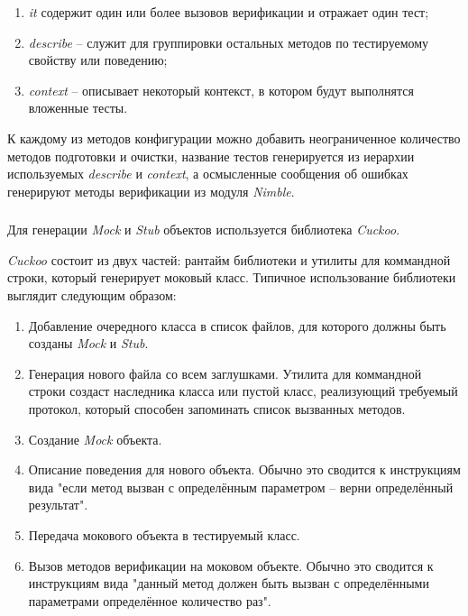 \begin{enumerate}
	\item \textit{it} содержит один или более вызовов верификации и отражает один тест;
	\item \textit{describe} -- служит для группировки остальных методов по тестируемому свойству или поведению;
	\item \textit{context} -- описывает некоторый контекст, в котором будут выполнятся вложенные тесты.
\end{enumerate}

К каждому из методов конфигурации можно добавить неограниченное количество методов подготовки и очистки, название тестов генерируется из иерархии используемых \textit{describe} и \textit{context}, а осмысленные сообщения об ошибках генерируют методы верификации из модуля \textit{Nimble}.

\subsubsection{}
\label{sec:testing:tech:cuckoo}
Для генерации \textit{Mock} и \textit{Stub} объектов используется библиотека \textit{Cuckoo}.

\textit{Cuckoo} состоит из двух частей: рантайм библиотеки и утилиты для коммандной строки, который генерирует моковый класс. Типичное использование библиотеки выглядит следующим образом:

\begin{enumerate}
	\item Добавление очередного класса в список файлов, для которого должны быть созданы \textit{Mock} и \textit{Stub}.
	\item Генерация нового файла со всем заглушками. Утилита для коммандной строки создаст наследника класса или пустой класс, реализующий требуемый протокол, который способен запоминать список вызванных методов.
	\item Создание \textit{Mock} объекта.
	\item Описание поведения для нового объекта. Обычно это сводится к инструкциям вида "если метод вызван с определённым параметром -- верни определённый результат".
	\item Передача мокового объекта в тестируемый класс.
	\item Вызов методов верификации на моковом объекте. Обычно это сводится к инструкциям вида "данный метод должен быть вызван с определёнными параметрами определённое количество раз".
\end{enumerate}

